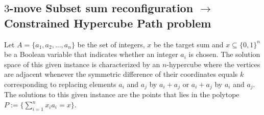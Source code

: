\subsection{$3$-move Subset sum reconfiguration $\rightarrow$ Constrained Hypercube Path problem}
Let $A = \{a_1, a_2, \dots, a_n\}$ be the set of integers, $x$ be the target sum and $x \subseteq \{0,1\}^{n}$ be a Boolean variable that indicates
whether an integer $a_i$ is chosen. The solution space of this given instance is characterized by an $n$-hypercube where
the vertices are adjacent whenever the symmetric difference of their coordinates equals $k$ corresponding to replacing
elements $a_i$ and $a_j$ by $a_i + a_j$ or $a_i + a_j$ by $a_i$ and $a_j$. The solutions to this given instance are the points
that lies in the polytope $P := \{ \sum_{i=1}^{n} x_{i}a_{i} = x\}$.


